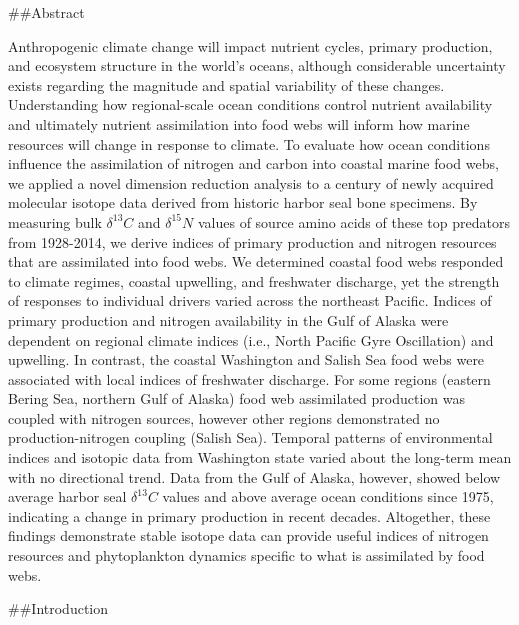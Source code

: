 \documentclass [11pt, proquest] {uwthesis}[2015/03/03]
\begin{document}
\#\#Abstract

Anthropogenic climate change will impact nutrient cycles, primary production, and ecosystem structure in the world's oceans, although considerable uncertainty exists regarding the magnitude and spatial variability of these changes. Understanding how regional-scale ocean conditions control nutrient availability and ultimately nutrient assimilation into food webs will inform how marine resources will change in response to climate. To evaluate how ocean conditions influence the assimilation of nitrogen and carbon into coastal marine food webs, we applied a novel dimension reduction analysis to a century of newly acquired molecular isotope data derived from historic harbor seal bone specimens. By measuring bulk \(\delta^{13}C\) and \(\delta^{15}N\) values of source amino acids of these top predators from 1928-2014, we derive indices of primary production and nitrogen resources that are assimilated into food webs. We determined coastal food webs responded to climate regimes, coastal upwelling, and freshwater discharge, yet the strength of responses to individual drivers varied across the northeast Pacific. Indices of primary production and nitrogen availability in the Gulf of Alaska were dependent on regional climate indices (i.e., North Pacific Gyre Oscillation) and upwelling. In contrast, the coastal Washington and Salish Sea food webs were associated with local indices of freshwater discharge. For some regions (eastern Bering Sea, northern Gulf of Alaska) food web assimilated production was coupled with nitrogen sources, however other regions demonstrated no production-nitrogen coupling (Salish Sea). Temporal patterns of environmental indices and isotopic data from Washington state varied about the long-term mean with no directional trend. Data from the Gulf of Alaska, however, showed below average harbor seal \(\delta^{13}C\) values and above average ocean conditions since 1975, indicating a change in primary production in recent decades. Altogether, these findings demonstrate stable isotope data can provide useful indices of nitrogen resources and phytoplankton dynamics specific to what is assimilated by food webs.

\#\#Introduction
\end{document}
